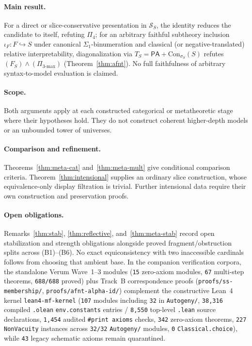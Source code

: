 \documentclass[11pt]{article}
\theoremstyle{plain}
\theoremstyle{definition}
\newcommand{\cS}{\mathcal{S}}
\newcommand{\Con}{\mathrm{Con}}
\newcommand{\PA}{\mathsf{PA}}
\begin{document}
\paragraph{Main result.} For a direct or slice-conservative presentation in $\cS_S$, the identity reduces the candidate to itself, refuting $\Pi_4$; for an arbitrary faithful subtheory inclusion $\iota_F : F \hookrightarrow S$ under canonical $\Sigma_1$-binumeration and classical (or negative-translated) relative interpretability, diagonalization via $T_S = \PA + \Con_{\sigma_S}(S)$ refutes $(F_S) \wedge (\Pi_{3\text{-max}})$ (Theorem~\ref{thm:afnt}). No full faithfulness of arbitrary syntax-to-model evaluation is claimed.

\paragraph{Scope.} Both arguments apply at each constructed categorical or metatheoretic stage where their hypotheses hold. They do not construct coherent higher-depth models or an unbounded tower of universes.

\paragraph{Comparison and refinement.} Theorems~\ref{thm:meta-cat} and~\ref{thm:meta-mult} give conditional comparison criteria. Theorem~\ref{thm:intensional} supplies an ordinary slice construction, whose equivalence-only display filtration is trivial. Further intensional data require their own construction and preservation proofs.

\paragraph{Open obligations.} Remarks~\ref{thm:stab}, \ref{thm:reflective}, and~\ref{thm:meta-stab} record open stabilization and strength obligations alongside proved fragment/obstruction splits across \textup{(B1)--(B6)}. No exact equiconsistency with two inaccessible cardinals follows from choosing that ambient base. In the companion verification corpora, the standalone Verum Wave~1--3 modules (\texttt{15} zero-axiom modules, \texttt{67} multi-step theorems, \texttt{688/688} proved) plus Track~B correspondence proofs (\texttt{proofs/ss-membership/}, \texttt{proofs/afnt-alpha-id/}) complement the constructive Lean~4 kernel \texttt{lean4-mf-kernel} (\texttt{107} modules including \texttt{32} in \texttt{Autogeny/}, \texttt{38{,}316} compiled \texttt{.olean} \texttt{env.constants} entries / \texttt{8{,}550} top-level \texttt{.lean} source declarations, \texttt{1{,}454} audited \texttt{\#print axioms} checks, \texttt{342} zero-axiom theorems, \texttt{227} \texttt{NonVacuity} instances across \texttt{32/32} \texttt{Autogeny/} modules, \texttt{0} \texttt{Classical.choice}), while \texttt{43} legacy schematic axioms remain quarantined.
\end{document}
